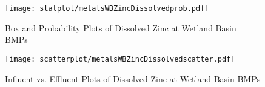         \begin{figure}[hb]   %
            \centering
            \texttt{[image: statplot/metalsWBZincDissolvedprob.pdf]}
            \caption{Box and Probability Plots of Dissolved Zinc at Wetland Basin BMPs}
        \end{figure}         %
        
        
        \begin{figure}[hb]   %
            \centering
            \texttt{[image: scatterplot/metalsWBZincDissolvedscatter.pdf]}
            \caption{Influent vs. Effluent Plots of Dissolved Zinc at Wetland Basin BMPs}
        \end{figure}         %
        \clearpage
        